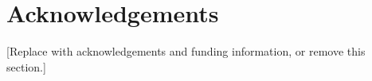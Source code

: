 \documentclass[11pt,a4paper]{labpaper}
\begin{document}
\maketitle

\ifLabCoverPage\clearpage\fi
\ifLabShowTOC
  \tableofcontents
  \clearpage
\fi





\ifLabAnonymous\else
  \section*{Acknowledgements}
  [Replace with acknowledgements and funding information, or remove this section.]
\fi


\ifLabShowAppendix
  \clearpage
  \appendix
  
\fi
\end{document}
